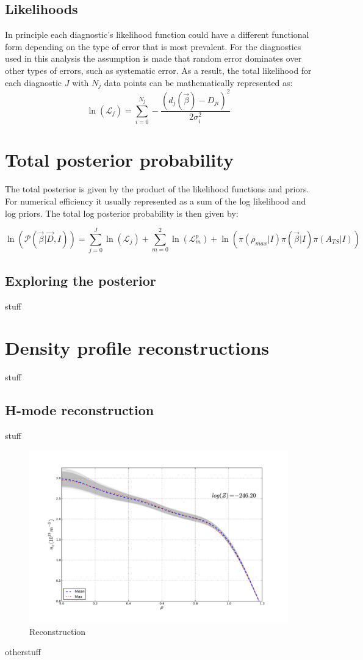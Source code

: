 \documentclass[12pt]{article}
\numberwithin{equation}{section}
\begin{document}
\subsection{Likelihoods}
In principle each diagnostic's likelihood function could have a different functional form depending on the type of error that is most prevalent. For the diagnostics used in this analysis the assumption is made that random error dominates over other types of errors, such as systematic error. As a result, the total likelihood for each diagnostic $J$ with $N_j$ data points can be mathematically represented as:
\begin{equation} \label{eq:k_like}
  \ln(\mathcal{L}_j) = \sum \limits_{i=0}^{N_j} -\frac{(d_j(\vec{\beta})-D_{ji})^2}{2 \sigma_i^2}
\end{equation}

\section{Total posterior probability}
The total posterior is given by the product of the likelihood functions and priors. For numerical efficiency it usually represented as a sum of the log likelihood and log priors. The total log posterior probability is then given by:

\begin{equation} \label{eq:tot_post} 
\ln(\mathcal{P}(\vec{\beta}|\vec{D},I)) = \sum \limits_{j=0}^{J} \ln(\mathcal{L}_j) + \sum \limits_{m=0}^{2} \ln(\mathcal{L}^p_m)  + \ln(\pi(\rho_{max}|I)\pi(\vec{\beta}|I)\pi(A_{TS}|I))
\end{equation}
\subsection{Exploring the posterior}
stuff
\section{Density profile reconstructions}
stuff
\subsection{H-mode reconstruction}
stuff
\begin{figure}[ht]
	\centering
	\includegraphics[width=12cm,keepaspectratio=true]{figures/bfit146102_00505_all5}
	\vspace{-30pt}
	\caption{Reconstruction}
\end{figure}
otherstuff
\end{document}
